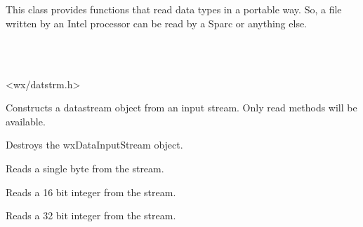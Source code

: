 \section{}\label{wxdatainputstream}

This class provides functions that read data types in a
portable way. So, a file written by an Intel processor can be read by a
Sparc or anything else.


\\
\\


<wx/datstrm.h>


\label{wxdatainputstreamconstr}


Constructs a datastream object from an input stream. Only read methods will
be available.





Destroys the wxDataInputStream object.



Reads a single byte from the stream.



Reads a 16 bit integer from the stream.



Reads a 32 bit integer from the stream.



